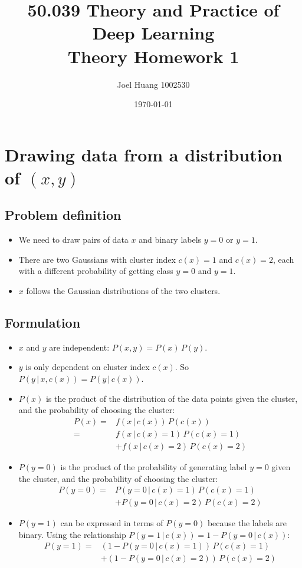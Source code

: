 \documentclass[9pt,twocolumn]{article}
\title{
	50.039 Theory and Practice of Deep Learning\\
	Theory Homework 1
}
\author{Joel Huang 1002530}
\date{\today}
\begin{document}
\maketitle

\section*{Drawing data from a distribution of $(x,y)$}
\subsection*{Problem definition}
\begin{itemize}
\item We need to draw pairs of data $x$ and binary labels $y=0$ or $y=1$.
\item There are two Gaussians with cluster index $c(x)=1$ and $c(x)=2$, each with a different probability of getting class $y=0$ and $y=1$.
\item $x$ follows the Gaussian distributions of the two clusters.
\end{itemize}

\subsection*{Formulation}
\begin{itemize}
\item $x$ and $y$ are independent: $P(x,y)=P(x)\,P(y)$.
\item $y$ is only dependent on cluster index $c(x)$. So $P(y\,|\,x,c(x))=P(y\,|\,c(x))$.
\item $P(x)$ is the product of the distribution of the data points given the cluster, and the probability of choosing the cluster:
\begin{equation*}
\begin{split}
	P(x) = & f(x\,|\,c(x))\,P(c(x))\\
	= & f(x\,|\,c(x)=1)\,P(c(x)=1)\\
	& + f(x\,|\,c(x)=2)\,P(c(x)=2)
\end{split}
\end{equation*}
\item $P(y=0)$ is the product of the probability of generating label $y=0$ given the cluster, and the probability of choosing the cluster:
\begin{equation*}
\begin{split}
	P(y=0) =&P(y=0\,|\,c(x)=1)\,P(c(x)=1) \\
	       &+P(y=0\,|\,c(x)=2)\,P(c(x)=2)
\end{split}
\end{equation*}
\item $P(y=1)$ can be expressed in terms of $P(y=0)$ because the labels are binary. Using the relationship $P(y=1\,|\,c(x)) = 1-P(y=0\,|\,c(x))$:
\begin{equation*}
\begin{split}
	P(y=1) = &(1-P(y=0\,|\,c(x)=1))\,P(c(x)=1) \\
	       & + (1-P(y=0\,|\,c(x)=2))\,P(c(x)=2)
\end{split}
\end{equation*}
\end{itemize}
\end{document}
